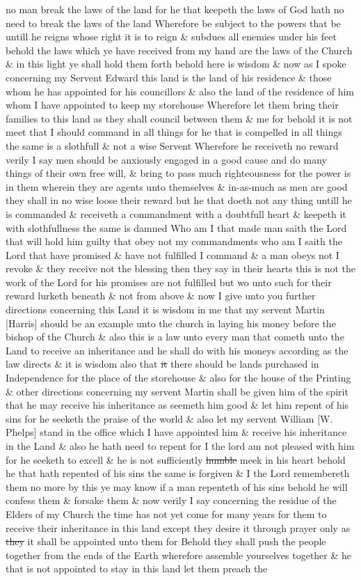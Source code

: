 no man break the laws of the land for he that keepeth the laws of God hath no need to break the laws of the land Wherefore be subject to the powers that be untill he reigns whose right it is to reign \& subdues all enemies under his feet behold the laws which ye have received from my hand are the laws of the Church \& in this light ye shall hold them forth behold here is wisdom \& now as I spoke concerning my Servent Edward this land is the land of his residence \& those whom he has appointed for his councillors \& also the land of the residence of him whom I have appointed to keep my storehouse Wherefore let them bring their families to this land as they shall council between them \& me for behold it is not meet that I should command in all things for he that is compelled in all things the same is a slothfull \& not a wise Servent Wherefore he receiveth no reward verily I say men should be anxiously engaged in a good cause and do many things of their own free will, \& bring to pass much righteousness for the power is in them wherein they are agents unto themselves \& in-as-much as men are good they shall in no wise loose their reward but he that doeth not any thing untill he is commanded \& receiveth a commandment with a doubtfull heart \& keepeth it with slothfullness the same is damned Who am I that made man saith the Lord that will hold him guilty that obey not my commandments who am I saith the Lord that have promised \& have not fulfilled I command \& a man obeys not I revoke \& they receive not the blessing then they say in their hearts this is not the work of the Lord for his promises are not fulfilled but wo unto such for their reward lurketh beneath \& not from above \& now I give unto you further directions concerning this Land it is wisdom in me that my servent Martin [Harris] should be an example unto the church in laying his money before the bishop of the Church \& also this is a law unto every man that cometh unto the Land to receive an inheritance and he shall do with his moneys according as the law directs \& it is wisdom also that \sout{it} there should be lands purchased in Independence for the place of the storehouse \& also for the house of the Printing \& other directions concerning my servent Martin shall be given him of the spirit that he may receive his inheritance as seemeth him good \& let him repent of his sins for he seeketh the praise of the world \& also let my servent William [W. Phelps] stand in the office which I have appointed him \& receive his inheritance in the Land \& also he hath need to repent for I the lord am not pleased with him for he seeketh to excell \& he is not sufficiently \sout{humble} meek in his heart behold he that hath repented of his sins the same is forgiven \& I the Lord remembereth them no more by this ye may know if a man repenteth of his sins behold he will confess them \& forsake them \& now verily I say concerning the residue of the Elders of my Church the time has not yet come for many years for them to receive their inheritance in this land except they desire it through prayer only as \sout{they} it shall be appointed unto them for Behold they shall push the people together from the ends of the Earth wherefore assemble yourselves together \& he that is not appointed to stay in this land let them preach the 